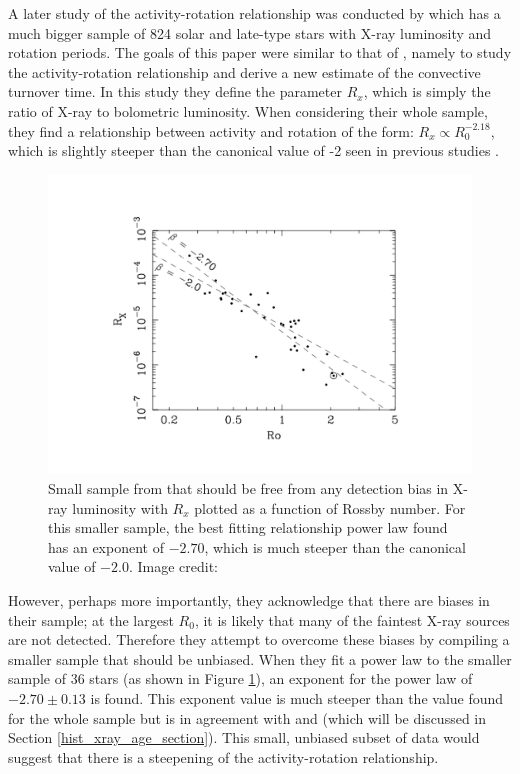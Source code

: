 A later study of the activity-rotation relationship was conducted by \citet{Wright_etal_2011} which has a much bigger sample of 824 solar and late-type stars with X-ray luminosity and rotation periods. The goals of this paper were similar to that of \citet{Pizzolato_etal_2003}, namely to study the activity-rotation relationship and derive a new estimate of the convective turnover time. In this study they define the parameter $R_{x}$, which is simply the ratio of X-ray to bolometric luminosity. When considering their whole sample, they find a relationship between activity and rotation of the form: $R_{x} \propto R_{0}^{-2.18}$, which is slightly steeper than the canonical value of -2 seen in previous studies \citep{Pallavicini_etal_1981,Pizzolato_etal_2003}.

\begin{figure}[h]
    \centering
    \includegraphics[scale=0.55]{Figures/2-Historical_overview/wright_etal_fig_3.pdf}
    \caption[Activity-rotation relationship for small, unbiased subset of \citet{Wright_etal_2011} data]{Small sample from \citet{Wright_etal_2011} that should be free from any detection bias in X-ray luminosity with $R_{x}$ plotted as a function of Rossby number. For this smaller sample, the best fitting relationship power law found has an exponent of $-2.70$, which is much steeper than the canonical value of $-2.0$. Image credit: \citet{Wright_etal_2011}}
    \label{fig:wright_etal_2011_plot}
\end{figure}

However, perhaps more importantly, they acknowledge that there are biases in their sample; at the largest $R_{0}$, it is likely that many of the faintest X-ray sources are not detected. Therefore they attempt to overcome these biases by compiling a smaller sample that should be unbiased. When they fit a power law to the smaller sample of 36 stars (as shown in Figure \ref{fig:wright_etal_2011_plot}), an exponent for the power law of $-2.70 \pm 0.13$ is found. This exponent value is much steeper than the value found for the whole sample but is in agreement with \citet{Gudel_etal_1997} and \citet{Feigelson_etal_2004} (which will be discussed in Section \ref{hist_xray_age_section}). This small, unbiased subset of data would suggest that there is a steepening of the activity-rotation relationship.


